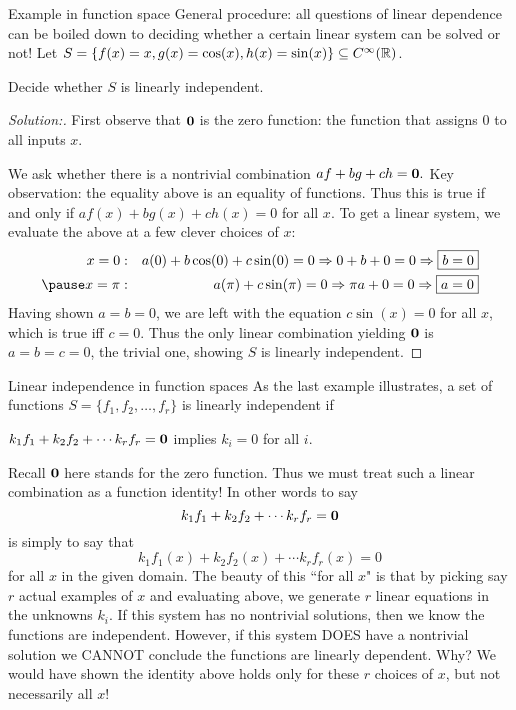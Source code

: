 \begin{frame}{Example in function space}
\alert{General procedure:} all questions of linear dependence can be boiled down to deciding whether a certain linear system can be solved or not!
\bspace
Let $S=\{f(x)=x, g(x)=\cos(x), h(x)=\sin(x)\}\subseteq C^\infty({\mathbb R})$. 

Decide whether $S$ is linearly independent.  
\pause
\begin{proof}[Solution:] 
First observe that ${\mathbf 0}$ is the zero function: the function that assigns 0 to all inputs $x$. 

We ask whether there is a \alert{nontrivial} combination 
$
af+bg+ch={\mathbf 0}.
$
\bpause \alert{Key observation:} the equality above is an equality of \alert{functions}. Thus this is true if and only if 
$
af(x)+bg(x)+ch(x)=0$ \alert{for all $x$}.
\bpause
To get a linear system, we evaluate the above at a few clever choices of $x$:
\begin{eqnarray*}
x=0&:& a(0)+b\cos(0)+c\sin(0)=0\Rightarrow 0+b+0=0\Rightarrow \boxed{b=0}\\
\pause x=\pi&:& a(\pi)+c\sin(\pi)=0\Rightarrow \pi a+0=0\Rightarrow \boxed{a=0}
\end{eqnarray*}
\pause Having shown $a=b=0$, we are left with the equation $c\sin(x)=0$ for all $x$, which is true iff $\boxed{c=0}$. 
\bpause
Thus the only linear combination yielding ${\mathbf 0}$ is $a=b=c=0$, the trivial one, showing $S$ is \alert{linearly independent}. 
\end{proof}
\end{frame}
\begin{frame}{Linear independence in function spaces}
As the last example illustrates, a set of functions $S=\{f_1,f_2, \dots ,f_r\}$ is linearly independent if 

$k_1f_1+k_2f_2+\cdots k_rf_r={\mathbf 0}$ implies $k_i=0$ for all $i$. 

\bpause Recall ${\mathbf 0}$ here stands for the \alert{zero function}. Thus we must treat such a linear combination as a function identity! In other words to say 
\[
k_1f_1+k_2f_2+\cdots k_rf_r={\mathbf 0}
\]   
is simply to say that 
\[
k_1f_1(x)+k_2f_2(x)+\cdots k_rf_r(x)=0
\]
\alert{for all $x$} in the given domain. 
\bpause The beauty of this ``for all $x$" is that by picking say $r$ actual examples of $x$ and evaluating above, we generate $r$ linear equations in the unknowns $k_i$.
\bpause If this system has no nontrivial solutions, then we know the functions are independent. 
\bpause However, if this system DOES have a nontrivial solution we CANNOT conclude the functions are linearly dependent. Why? We would have shown the identity above holds only for these $r$ choices of $x$, but not necessarily \alert{all} $x$!   
\end{frame}
